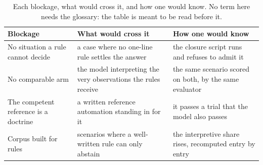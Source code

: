 \begin{table}[H]
\centering
\caption{Each blockage, what would cross it, and how one would know. No term here
needs the glossary: the table is meant to be read before it.}
\label{tab:jusquou}
\small
\begin{tabularx}{\linewidth}{@{}p{3.4cm}Yp{4.0cm}@{}}
\toprule
Blockage & What would cross it & How one would know \\
\midrule
No situation a rule cannot decide & a case where no one-line rule settles the answer &
the closure script runs and refuses to admit it \\
No comparable arm & the model interpreting the very observations the rules
receive & the same scenario scored on both, by the same evaluator \\
The competent reference is a doctrine & a written reference automation standing in
for it & it passes a trial that the model also passes \\
Corpus built for rules & scenarios where a well-written rule can only abstain &
the interpretive share rises, recomputed entry by entry \\
\bottomrule
\end{tabularx}
\end{table}
